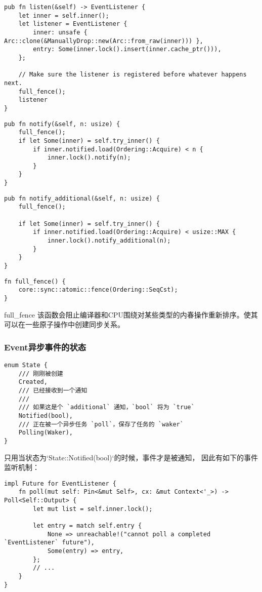 \begin{lstlisting}[caption = 监听者的注册]
pub fn listen(&self) -> EventListener {
    let inner = self.inner();
    let listener = EventListener {
        inner: unsafe { Arc::clone(&ManuallyDrop::new(Arc::from_raw(inner))) },
        entry: Some(inner.lock().insert(inner.cache_ptr())),
    };

    // Make sure the listener is registered before whatever happens next.
    full_fence();
    listener
}
\end{lstlisting}

\begin{lstlisting}[caption = 通知一定数量的监听者]
pub fn notify(&self, n: usize) {
    full_fence();
    if let Some(inner) = self.try_inner() {
        if inner.notified.load(Ordering::Acquire) < n {
            inner.lock().notify(n);
        }
    }
}
\end{lstlisting}

\begin{lstlisting}[caption = 通知一定数量没有被通知的监听者]
pub fn notify_additional(&self, n: usize) {
    full_fence();

    if let Some(inner) = self.try_inner() {
        if inner.notified.load(Ordering::Acquire) < usize::MAX {
            inner.lock().notify_additional(n);
        }
    }
}
\end{lstlisting}

\begin{lstlisting}[caption=full\_fence]
fn full_fence() {
    core::sync::atomic::fence(Ordering::SeqCst);
}
\end{lstlisting}

full\_fence 该函数会阻止编译器和CPU围绕对某些类型的内春操作重新排序。使其可以在一些原子操作中创建同步关系。

\subsubsection{Event异步事件的状态}
\begin{lstlisting}[caption=Event的状态]
enum State {
    /// 刚刚被创建
    Created,
    /// 已经接收到一个通知
    ///
    /// 如果这是个 `additional` 通知，`bool` 将为 `true`
    Notified(bool),
    /// 正在被一个异步任务 `poll`，保存了任务的 `waker`
    Polling(Waker),
}
\end{lstlisting}

只用当状态为`State::Notified(bool)`的时候，事件才是被通知， 因此有如下的事件监听机制：

\begin{lstlisting}[caption=Event的事件获取并判断事件是否完成]
impl Future for EventListener {
    fn poll(mut self: Pin<&mut Self>, cx: &mut Context<'_>) -> Poll<Self::Output> {
        let mut list = self.inner.lock();

        let entry = match self.entry {
            None => unreachable!("cannot poll a completed `EventListener` future"),
            Some(entry) => entry,
        };
        // ...
    }
}
\end{lstlisting}


